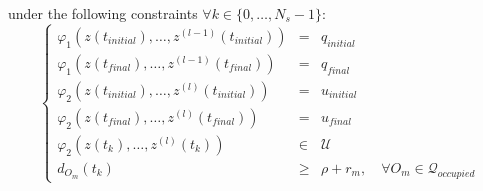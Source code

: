 under the following constraints $\forall k \in \{0,\dotsc,N_s -1\}$:
\begin{equation}%
\left\lbrace\begin{array}{lcl}
    \varphi_1(z(t_{initial}),\dotsc,z^{(l-1)}(t_{initial})) & = & q_{initial}\\
    \varphi_1(z(t_{final}),\dotsc,z^{(l-1)}(t_{final})) & = & q_{final}\\
    \varphi_2(z(t_{initial}),\dotsc,z^{(l)}(t_{initial})) & = & u_{initial}\\
    \varphi_2(z(t_{final}),\dotsc,z^{(l)}(t_{final}))& = & u_{final}\\
    \varphi_2(z(t_k),\dotsc,z^{(l)}(t_k)) &\in& \mathcal{U}\\
    d_{O_m}(t_k) &\geq& \rho + r_m,\quad \forall O_m \in \mathcal{Q}_{occupied}
\end{array}\right.
\end{equation}

% 
% 
% 






